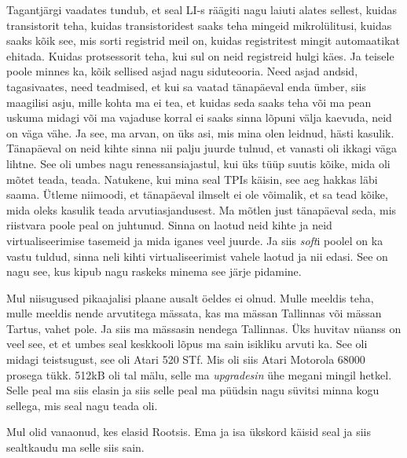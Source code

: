 Tagantjärgi  vaadates tundub, et  seal LI-s räägiti nagu laiuti alates sellest, 
kuidas transistorit teha, kuidas transistoridest saaks teha mingeid 
mikrolülitusi, kuidas saaks kõik see, mis sorti registrid meil on, kuidas 
registritest mingit automaatikat ehitada. Kuidas protsessorit teha, kui sul on 
neid registreid hulgi käes. Ja  teisele  poole minnes ka, kõik sellised asjad 
nagu siduteooria. Need asjad andsid, tagasivaates, need teadmised, et kui sa 
vaatad tänapäeval enda ümber, siis maagilisi asju, mille kohta ma ei tea, et 
kuidas seda saaks teha või ma pean uskuma midagi või ma vajaduse korral ei 
saaks sinna lõpuni välja kaevuda, neid on väga vähe. Ja see, ma arvan, on üks 
asi, mis mina olen leidnud, hästi kasulik. Tänapäeval on neid kihte sinna nii 
palju juurde tulnud, et vanasti oli ikkagi väga lihtne. See oli umbes nagu 
renessansiajastul, kui üks tüüp suutis  kõike, mida oli mõtet teada, teada. 
Natukene, kui  mina seal TPIs käisin, see aeg hakkas läbi saama. Ütleme 
niimoodi, et tänapäeval ilmselt ei ole võimalik, et sa tead kõike, mida oleks 
kasulik teada arvutiasjandusest. Ma mõtlen just tänapäeval seda, mis riistvara 
poole peal on juhtunud. Sinna on laotud neid kihte ja neid virtualiseerimise 
tasemeid ja mida iganes veel juurde. Ja siis \emph{soft}i poolel on ka vastu 
tuldud, sinna neli kihti virtualiseerimist vahele laotud ja nii edasi. See on 
nagu see, kus kipub nagu raskeks minema see järje pidamine.


Mul niisugused pikaajalisi plaane ausalt öeldes ei olnud. Mulle meeldis teha, 
mulle meeldis nende arvutitega mässata, kas ma mässan Tallinnas või mässan 
Tartus, vahet pole. Ja siis ma mässasin nendega Tallinnas. Üks huvitav nüanss 
on veel see, et et umbes seal keskkooli lõpus ma sain isikliku arvuti ka. See 
oli midagi teistsugust, see oli Atari 520 STf. Mis 
oli siis Atari Motorola 68000 prosega tükk. 512kB oli tal mälu, selle ma 
\emph{upgradesin}  ühe megani mingil hetkel. Selle peal ma siis elasin ja 
siis selle peal ma püüdsin nagu süvitsi minna kogu sellega, mis seal nagu teada 
oli. 


Mul olid vanaonud, kes elasid Rootsis. Ema ja isa ükskord käisid seal ja siis 
sealtkaudu ma selle siis sain. 


